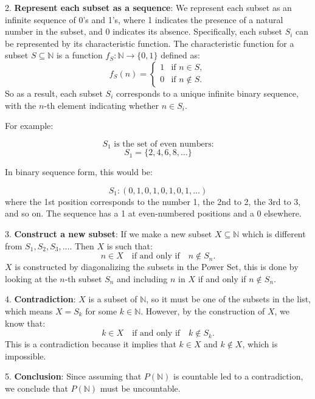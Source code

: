 \documentclass[12pt]{article}
\begin{document}
2. \textbf{Represent each subset as a sequence}: We represent each subset as an infinite sequence of 0's and 1's, where 1 indicates the presence of a natural number in the subset, and 0 indicates its absence. Specifically, each subset \( S_i \) can be represented by its characteristic function. The characteristic function for a subset \( S \subseteq \mathbb{N} \) is a function \( f_S: \mathbb{N} \to \{0, 1\} \) defined as:
   \[
   f_S(n) =
   \begin{cases}
   1 & \text{if } n \in S, \\
   0 & \text{if } n \notin S.
   \end{cases}
   \]
   So as a result, each subset \( S_i \) corresponds to a unique infinite binary sequence, with the \( n \)-th element indicating whether \( n \in S_i \).\newline

   For example:

\[
S_1 \text{ is the set of even numbers:}
\]
\[
S_1 = \{ 2, 4, 6, 8, \dots \}
\]

In binary sequence form, this would be:

\[
S_1: (0, 1, 0, 1, 0, 1, 0, 1, \dots)
\]
where the 1st position corresponds to the number 1, the 2nd to 2, the 3rd to 3, and so on. The sequence has a 1 at even-numbered positions and a 0 elsewhere.\newline


3. \textbf{Construct a new subset}: If we make a new subset \( X \subseteq \mathbb{N} \) which is different from \( S_1, S_2, S_3, \dots \). Then \( X \) is such that:
   \[
   n \in X \quad \text{if and only if} \quad n \notin S_n.
   \]
    \( X \) is constructed by diagonalizing the subsets in the Power Set, this is done by looking at the \( n \)-th subset \( S_n \) and including \( n \) in \( X \) if and only if \( n \notin S_n \).\newline

4. \textbf{Contradiction}: \( X \) is a subset of \( \mathbb{N} \), so it must be one of the subsets in the list, which means \( X = S_k \) for some \( k \in \mathbb{N} \). However, by the construction of \( X \), we know that:
   \[
   k \in X \quad \text{if and only if} \quad k \notin S_k.
   \]
   This is a contradiction because it implies that \( k \in X \) and \( k \notin X \), which is impossible.\newline

5. \textbf{Conclusion}: Since assuming that \( P(\mathbb{N}) \) is countable led to a contradiction, we conclude that \( P(\mathbb{N}) \) must be uncountable.
\vspace{12pt}
\end{document}
